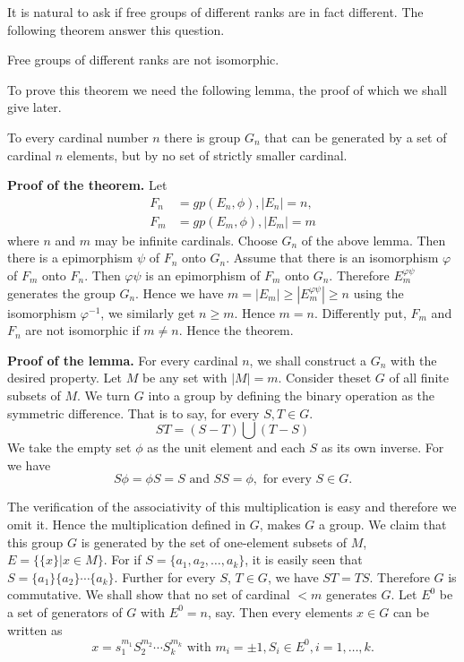 It is natural to ask if free groups of different ranks are in fact
different. The following theorem answer this question. 

\begin{theorem}\label{chap4:sec4:thm7} %
  Free groups of different ranks are not isomorphic.
\end{theorem}

To prove this theorem we need the following lemma, the proof of which
we shall give later. 
\begin{lemma*}
  To every cardinal number $n$ there is group $G_n$ that can be
  generated by a set of cardinal $n$ elements, but by no set of
  strictly smaller cardinal. 
\end{lemma*}

\noindent \textbf{Proof of the theorem.} 
  Let 
  \begin{align*} 
    F_n &= gp(E_n, \phi), |E_n| =n,\\ 
    F_m &=gp(E_m, \phi), |E_m| =m 
  \end{align*}
  where $n$ and $m$ may be infinite cardinals. Choose $G_n$ of the
  above lemma. Then there is a epimorphism $\psi$ of $F_n$ onto
  $G_n$. Assume that there is an isomorphism 
  $\varphi$ of $F_m$ onto $F_n$. Then $\varphi \psi$ is an
  epimorphism of $F_m$ onto $G_n$.  Therefore $E_m^{\varphi \psi}$
  generates the group $G_n$. Hence we have $m=|E_m|\geq |E_m^{\varphi
    \psi}|\geq n$ using the isomorphism $\varphi^{-1}$, we similarly
  get $n \geq m$. Hence $m=n$. Differently put, $F_m$ and $F_n$ are
  not isomorphic if $m \neq n$. Hence the theorem.  
 
\noindent\textbf{Proof of the lemma.}
  For every cardinal $n$, we shall construct a $G_n$ with the desired
  property. Let $M$ be any set with $|M|=m$. Consider the\pageoriginale set $G$ of
  all finite subsets of $M$. We turn $G$ into a group by defining the
  binary operation as the symmetric difference. That is to say, for
  every $S,T \in  G$. 
  $$
  ST=(S-T)\bigcup (T-S)
  $$
  We take the empty set $\phi$ as the unit element and each $S$ as its
  own inverse. For we have 
  $$
  S \phi=\phi S=S \text{ and }SS=\phi, \text{ for every } S \in  G.
  $$

  The verification of the associativity of this multiplication is easy
  and therefore we omit it. Hence the multiplication defined in $G$,
  makes $G$ a group. We  claim that this group $G$ is generated by the
  set of one-element subsets of $M$, $E= \bigg \{ \{ x\} \bigg | x \in
  M \bigg \}$. For if $S=\bigg \{ a_1,a_2, \ldots, a_k \bigg \}$, it
  is easily seen that $S=\{ a_1\} \{ a_2\} \cdots \{ a_k \}$. Further
  for every $S$, $T \in  G$, we have $ST=TS$. Therefore $G$ is
  commutative. We shall show that no set of cardinal $<m$ generates
  $G$. Let $E^0$ be a set of generators of $G$ with $E^0=n$, say. Then
  every elements $x \in  G$ can be written as 
  $$
  x=s^{m_1}_1 S^{m_2}_2 \cdots S^{m_k}_k \text{ with } m_i=\pm1, S_i
  \in  E^0, i=1,\ldots, k. 
  $$

